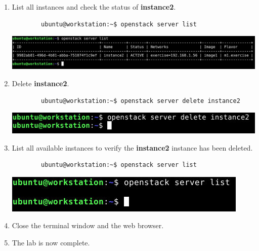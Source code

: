 \documentclass[letterpaper, 12pt]{article}
\begin{document}
\begin{enumerate}
    \item List all instances and check the status of \textbf{instance2}.
    \begin{lstlisting}
        ubuntu@workstation:~$ openstack server list
    \end{lstlisting}

    \begin{center}
        \includegraphics[width=\linewidth]{images/part5/step18.png}
    \end{center}

    \item Delete \textbf{instance2}.
    \begin{lstlisting}
        ubuntu@workstation:~$ openstack server delete instance2
    \end{lstlisting}

    \begin{center}
        \includegraphics[width=\linewidth]{images/part5/step19.png}
    \end{center}

    \item List all available instances to verify the \textbf{instance2} instance has been deleted.
    \begin{lstlisting}
        ubuntu@workstation:~$ openstack server list
    \end{lstlisting}

    \begin{center}
        \includegraphics[width=\linewidth]{images/part5/step20.png}
    \end{center}

    \item Close the terminal window and the web browser.
    
    \item The lab is now complete.

\end{enumerate}
\end{document}
